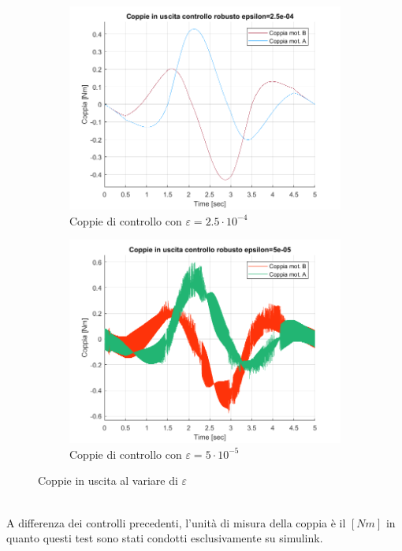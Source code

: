 \begin{figure}[!ht]
	\begin{subfigure}{.53\textwidth}
		\centering
		\includegraphics[width=.8\linewidth]{Immagini/Traiettorie/CoppieRobustoe25}  
		\caption{Coppie di controllo con $\varepsilon = 2.5\cdot 10^{-4}$ }
		\label{fig:rob3}
	\end{subfigure}
	\begin{subfigure}{.53\textwidth}
		\centering
		\includegraphics[width=.8\linewidth]{Immagini/Traiettorie/CoppieRobustoe5}  
		\caption{Coppie di controllo con $\varepsilon = 5\cdot 10^{-5}$}
		\label{fig:rob4}
	\end{subfigure}
	\caption{Coppie in uscita al variare di $\varepsilon$}
\end{figure}
\\A differenza dei controlli precedenti, l'unità di misura della coppia è il $[Nm]$ in quanto questi test sono stati condotti esclusivamente su simulink.
